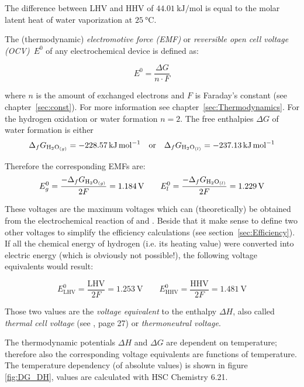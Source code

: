 \documentclass[11pt,a4paper,english,twoside]{scrreprt}
\begin{document}
The difference between LHV and HHV of $\SI{44.01}{\kilo\joule\per\mole}$ is equal to the molar latent heat of water vaporization at $\SI{25}{\degreeCelsius}$.

The (thermodynamic) \textit{electromotive force (EMF)} or \textit{reversible open cell voltage (OCV)}~$E^{0}$ of any electrochemical device is defined as:

\[E^{0} =\frac{\Delta G}{n\cdot F} \]

where $n$ is the amount of exchanged electrons and $F$ is Faraday's constant (see chapter~\ref{sec:const}). For more information see chapter~\ref{sec:Thermodynamics}. For the hydrogen oxidation or water formation $n=2$. The free enthalpies $\Delta G$ of water formation is either 
\[
\Delta_f G_{\ce{H2O}_{(g)} } =\SI{-228.57}{\kilo\joule\per\mole} \quad \mbox{or} \quad
\Delta_f G_{\ce{H2O}_{(l)} } =\SI{-237.13}{\kilo\joule\per\mole}
\]

Therefore the corresponding EMFs are:
\begin{equation}
  \label{eqn:E_dG}
  E_{g}^{0} =\frac{-\Delta_f G_{\ce{H2O}_{(g)}}}{2F} =\SI{1.184}{\volt} \qquad
  E_{l}^{0} =\frac{-\Delta_f G_{\ce{H2O}_{(l)}}}{2F} =\SI{1.229}{\volt}
\end{equation}

These voltages are the maximum voltages which can (theoretically) be obtained from the electrochemical reaction of  and . Beside that it make sense to define two other voltages to simplify the efficiency calculations (see section~\ref{sec:Efficiency}). If all the chemical energy of hydrogen (i.e. its heating value) were converted into electric energy (which is obviously not possible!), the following voltage equivalents would result:

\begin{equation}
  \label{eqn:E_dH}
  E_\text{LHV}^{0} =\frac{\text{LHV}}{2F} =\SI{1.253}{\volt} \qquad
  E_\text{HHV}^{0} =\frac{\text{HHV}}{2F} =\SI{1.481}{\volt}
\end{equation}

Those two values are the \textit{voltage equivalent} to the enthalpy $\Delta H$, also called \textit{thermal cell voltage} (see \cite{HFC}, page 27) or \textit{thermoneutral voltage}.

The thermodynamic potentials $\Delta H$ and $\Delta G$ are dependent on temperature; therefore also the corresponding voltage equivalents are functions of temperature. The temperature dependency (of absolute values) is shown in figure \ref{fig:DG_DH}, values are calculated with HSC Chemistry 6.21. 
\end{document}
